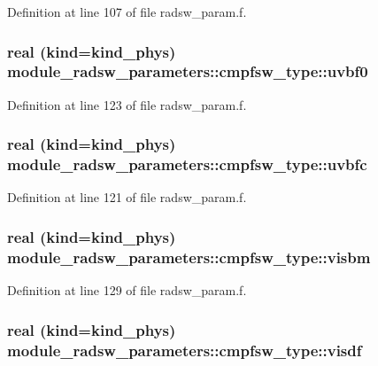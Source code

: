 Definition at line 107 of file radsw\+\_\+param.\+f.

\subsubsection[{\texorpdfstring{uvbf0}{uvbf0}}]{\setlength{\rightskip}{0pt plus 5cm}real (kind=kind\+\_\+phys) module\+\_\+radsw\+\_\+parameters\+::cmpfsw\+\_\+type\+::uvbf0}\hypertarget{group__module__radsw__main_ga9e9e74c17ad3aa0a1c280f1eae513b22}{}\label{group__module__radsw__main_ga9e9e74c17ad3aa0a1c280f1eae513b22}


Definition at line 123 of file radsw\+\_\+param.\+f.

\subsubsection[{\texorpdfstring{uvbfc}{uvbfc}}]{\setlength{\rightskip}{0pt plus 5cm}real (kind=kind\+\_\+phys) module\+\_\+radsw\+\_\+parameters\+::cmpfsw\+\_\+type\+::uvbfc}\hypertarget{group__module__radsw__main_ga7b0ac40e0ceb2ce82b6b95a614542b4f}{}\label{group__module__radsw__main_ga7b0ac40e0ceb2ce82b6b95a614542b4f}


Definition at line 121 of file radsw\+\_\+param.\+f.

\subsubsection[{\texorpdfstring{visbm}{visbm}}]{\setlength{\rightskip}{0pt plus 5cm}real (kind=kind\+\_\+phys) module\+\_\+radsw\+\_\+parameters\+::cmpfsw\+\_\+type\+::visbm}\hypertarget{group__module__radsw__main_gaabfae10580f53c63900c74261b1b219c}{}\label{group__module__radsw__main_gaabfae10580f53c63900c74261b1b219c}


Definition at line 129 of file radsw\+\_\+param.\+f.

\subsubsection[{\texorpdfstring{visdf}{visdf}}]{\setlength{\rightskip}{0pt plus 5cm}real (kind=kind\+\_\+phys) module\+\_\+radsw\+\_\+parameters\+::cmpfsw\+\_\+type\+::visdf}\hypertarget{group__module__radsw__main_ga3eb91eab30abc0f1f1bb05c5447cede5}{}\label{group__module__radsw__main_ga3eb91eab30abc0f1f1bb05c5447cede5}



